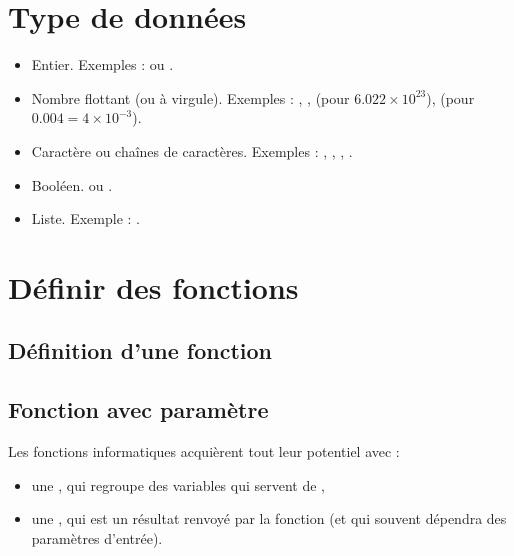 \documentclass[11pt,class=report,crop=false]{standalone}
\begin{document}
\section{Type de données}


\begin{itemize}
  \item {}  \quad Entier. Exemples :  ou .
  \item {} \quad Nombre flottant (ou à virgule). Exemples : ,
,  (pour $6.022 \times 10^{23}$),  (pour $0.004 = 4 \times 10^{-3}$).
  \item {} \quad Caractère ou chaînes de caractères. Exemples : ,
  , , . 
  \item {} \quad Booléen.  ou .
  \item {} \quad Liste. Exemple : \ci{[1,2,3,4]}.
\end{itemize}



\section{Définir des fonctions}

\subsection{Définition d'une fonction}


\subsection{Fonction avec paramètre}

Les fonctions informatiques acquièrent tout leur potentiel avec :
\begin{itemize}
  \item une , qui regroupe des variables qui servent de ,
  \item une , qui est un résultat renvoyé par la fonction (et qui souvent dépendra des paramètres d'entrée).
\end{itemize}
\end{document}

